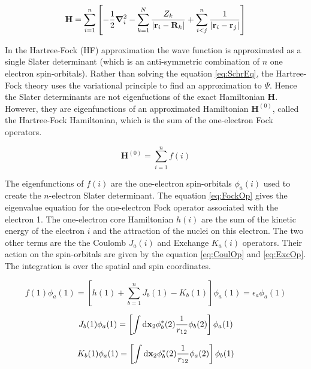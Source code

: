 \documentclass[11pt,a4paper]{article}
\newcommand{\bH}{\mathbf{H}}
\begin{document}
\begin{equation}\label{eq:ExactHamiltonian}
    \bH=\sum\limits_{i=1}^{n}\left[ -\frac{1}{2}\grad_i^2 - \sum\limits_{k=1}^{N} \frac{Z_k}{|\vb{r}_i-\vb{R}_k|}+\sum\limits_{i<j}^{n}\frac{1}{|\vb{r}_i-\vb{r}_j|}\right]
\end{equation}

In the Hartree-Fock (HF) approximation the wave function is approximated as a single Slater determinant (which is an anti-symmetric combination of $n$ one electron spin-orbitals). Rather than solving the equation \eqref{eq:SchrEq}, the Hartree-Fock theory uses the variational principle to find an approximation to $\Psi$. Hence the Slater determinants are not eigenfuctions of the exact Hamiltonian $\bH$. However, they are eigenfunctions of an approximated Hamiltonian $\bH^{(0)}$, called the Hartree-Fock Hamiltonian, which is the sum of the one-electron Fock operators.

\begin{equation}\label{eq:HFHamiltonian}
\bH^{(0)}= \sum\limits_{i=1}^{n} f(i)
\end{equation}

The eigenfunctions of $f(i)$ are the one-electron spin-orbitals $\phi_a(i)$ used to create the $n$-electron Slater determinant. The equation \eqref{eq:FockOp} gives the eigenvalue equation for the one-electron Fock operator associated with the electron 1. The one-electron core Hamiltonian $h(i)$ are the sum of the kinetic energy of the electron $i$ and the attraction of the nuclei on this electron. The two other terms are the the Coulomb $J_a(i)$ and Exchange $K_a(i)$ operators. Their action on the spin-orbitals are given by the equation \eqref{eq:CoulOp} and \eqref{eq:ExcOp}. The integration is over the spatial and spin coordinates.

\begin{equation}\label{eq:FockOp}
f(1)\phi_a(1) = \left[h(1) + \sum\limits_{b=1}^{n} J_b(1) - K_b(1)\right]\phi_a(1)=\epsilon_a\phi_a(1)
\end{equation}

\begin{equation}\label{eq:CoulOp}
J_b(1)\phi_a(1)=\left[\int\dd\vb{x}_2\phi_b^*(2)\frac{1}{r_{12}}\phi_b(2) \right]\phi_a(1)
\end{equation}

\begin{equation}\label{eq:ExcOp}
K_b(1)\phi_a(1)=\left[\int\dd\vb{x}_2\phi_b^*(2)\frac{1}{r_{12}}\phi_a(2) \right]\phi_b(1)
\end{equation}
\end{document}
